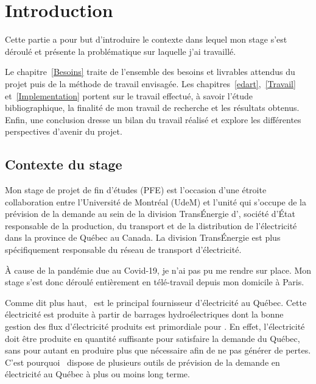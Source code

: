 \chapter*{Introduction}\label{Indrotuction}

Cette partie a pour but d'introduire le contexte dans lequel mon stage s'est déroulé et présente la problématique sur laquelle j'ai travaillé. 

Le chapitre~\ref{Besoins} traite de l'ensemble des besoins et livrables attendus du projet puis de la méthode de travail
envisagée. Les chapitres~\ref{edart},~\ref{Travail} et~\ref{Implementation} portent sur le travail effectué, à savoir l'étude bibliographique, 
la finalité de mon travail de recherche et les résultats obtenus. Enfin, une conclusion dresse un bilan du travail réalisé et explore les différentes perspectives d'avenir du projet.

\section*{Contexte du stage}\label{contexte}


Mon stage de projet de fin d'études (PFE) est l'occasion d'une étroite collaboration entre l'Université de Montréal (UdeM) 
et l'unité qui s'occupe de la prévision de la demande au sein de la division Trans\'Energie d'\HQ, société d'\'Etat responsable de la production, du transport et 
de la distribution de l'électricité dans la province de Québec au Canada. La division Trans\'Energie est plus spécifiquement responsable du réseau de transport d'électricité.

\`A cause de la pandémie due au Covid-19, je n'ai pas pu me rendre sur place. Mon stage s'est 
donc déroulé entièrement en télé-travail depuis mon domicile à Paris. 

Comme dit plus haut, \HQ\ est le principal fournisseur d'électricité au Québec. 
Cette électricité est produite à partir de barrages hydroélectriques dont la bonne gestion des flux d'électricité 
produits est primordiale pour \HQ. En effet, l'électricité doit être produite en quantité suffisante pour satisfaire la demande du Québec, sans pour autant en 
produire plus que nécessaire afin de ne pas générer de pertes. C'est pourquoi \HQ\ dispose de plusieurs outils de prévision de la demande en électricité au 
Québec à plus ou moins long terme.

